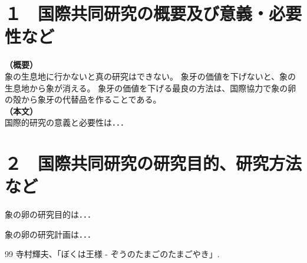 \documentclass[11pt,a4j,dvipdfmx]{jarticle} 					%
\newcommand{\研究課題名}{象の卵}
\newcommand{\研究機関名}{逢坂大学}
\newcommand{\研究代表者氏名}{湯川秀樹}
\begin{document}

\section{１　国際共同研究の概要及び意義・必要性など}

\JSPSInstructions	%
\noindent
\textbf{（概要）}\\
	象の生息地に行かないと真の研究はできない。
	象牙の価値を下げないと、象の生息地から象が消える。
	象牙の価値を下げる最良の方法は、国際協力で象の卵の殻から象牙の代替品を作ることである。
\\

\noindent
\textbf{（本文）}\\
	国際的研究の意義と必要性は．．．




\section{２　国際共同研究の研究目的、研究方法など}

	 象の卵の研究目的は．．．

	象の卵の研究計画は．．．

	\vspace{1cm}
	\begin{thebibliography}{99}
		 寺村輝夫、「ぼくは王様 - ぞうのたまごのたまごやき」.
	\end{thebibliography}




\end{document}
